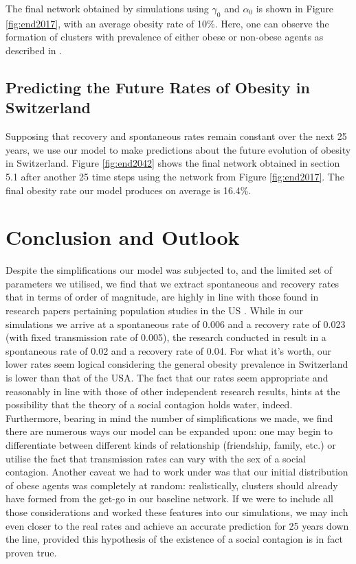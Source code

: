 \documentclass[11pt]{article}
\begin{document}
The final network obtained by simulations using $\gamma_0$ and $\alpha_0$ is shown in Figure \ref{fig:end2017}, with an average obesity rate of 10\%. Here, one can observe the formation of clusters with prevalence of either obese or non-obese agents as described in \cite{spreadOfObesityPaper}.

\subsection{Predicting the Future Rates of Obesity in Switzerland}

Supposing that recovery and spontaneous rates remain constant over the next 25 years, we use our model to make predictions about the future evolution of obesity in Switzerland. Figure \ref{fig:end2042} shows the final network obtained in section 5.1 after another 25 time steps using the network from Figure \ref{fig:end2017}. The final obesity rate our model produces on average is 16.4\%.

\newpage

\section{Conclusion and Outlook}

Despite the simplifications our model was subjected to, and the limited set of parameters we utilised, we find that we extract spontaneous and recovery rates that in terms of order of magnitude, are highly in line with those found in research papers pertaining population studies in the US \cite{infectiousDiseaseModeling}. While in our simulations we arrive at a spontaneous rate of 0.006 and a recovery rate of 0.023 (with fixed transmission rate of 0.005), the research conducted in \cite{infectiousDiseaseModeling} result in a spontaneous rate of 0.02 and a recovery rate of 0.04. For what it's worth, our lower rates seem logical considering the general obesity prevalence in Switzerland is lower than that of the USA. The  fact that our rates seem appropriate and reasonably in line with those of other independent research results, hints at the possibility that the theory of a social contagion holds water, indeed. \\

Furthermore, bearing in mind the number of simplifications we made, we find there are numerous ways our model can be expanded upon: one may begin to differentiate between different kinds of relationship (friendship, family, etc.)\cite{spreadOfObesityPaper} or utilise the fact that transmission rates can vary with the sex of a social contagion. Another caveat we had to work under was that our initial distribution of obese agents was completely at random: realistically, clusters should already have formed from the get-go in our baseline network. If we were to include all those considerations and worked these features into our simulations, we may inch even closer to the real rates and achieve an accurate prediction for 25 years down the line, provided this hypothesis of the existence of a social contagion is in fact proven true.\\
\end{document}
